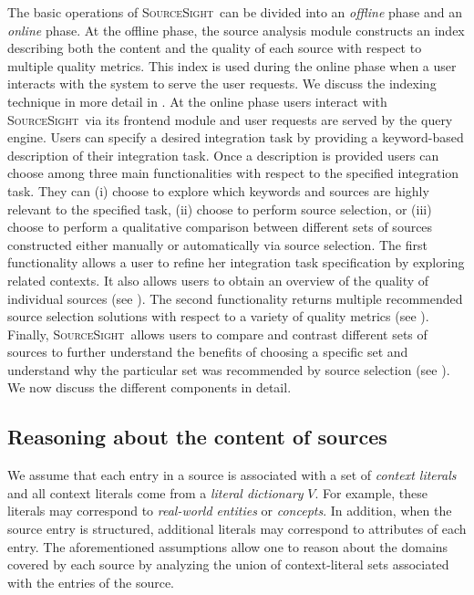 \documentclass{vldb}
\newcommand\system{\textsc{SourceSight}}
\begin{document}
The basic operations of \system~can be divided into an {\em offline} phase and an {\em online} phase. At the offline phase, the source analysis module constructs an index describing both the content and the quality of each source with respect to multiple quality metrics. This index is used during the online phase when a user interacts with the system to serve the user requests. We discuss the indexing technique in more detail in . At the online phase users interact with \system~via its frontend module and user requests are served by the query engine. Users can specify a desired integration task by providing a keyword-based description of their integration task. Once a description is provided users can choose among three main functionalities with respect to the specified integration task. They can (i) choose to explore which keywords and sources are highly relevant to the specified task, (ii) choose to perform source selection, or (iii) choose to perform a qualitative comparison between different sets of sources constructed either manually or automatically via source selection. The first functionality allows a user to refine her integration task specification by exploring related contexts. It also allows users to obtain an overview of the quality of individual sources (see ). The second functionality returns multiple recommended source selection solutions with respect to a variety of quality metrics (see ). Finally, \system~allows users to compare and contrast different sets of sources to further understand the benefits of choosing a specific set and understand why the particular set was recommended by source selection (see ). We now discuss the different components in detail.

\subsection{Reasoning about the content of sources}
\label{sec:reasoning}
We assume that each entry in a source is associated with a set of {\em context literals} and all context literals come from a {\em literal dictionary} $V$. For example, these literals may correspond to {\em real-world entities} or {\em concepts}. In addition, when the source entry is structured, additional literals may correspond to attributes of each entry. The aforementioned assumptions allow one to reason about the domains covered by each source by analyzing the union of context-literal sets associated with the entries of the source. 
\end{document}
